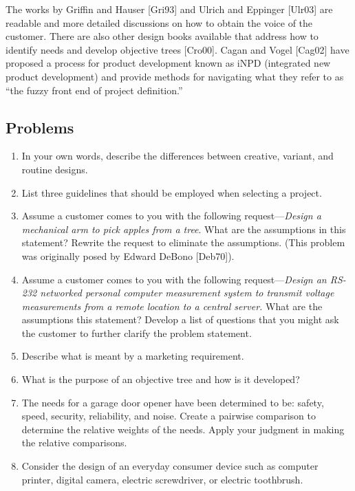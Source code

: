 The works by Griffin and Hauser {[}Gri93{]} and Ulrich and Eppinger
{[}Ulr03{]} are readable and more detailed discussions on how to obtain
the voice of the customer. There are also other design books available
that address how to identify needs and develop objective trees
{[}Cro00{]}. Cagan and Vogel {[}Cag02{]} have proposed a process for
product development known as iNPD (integrated new product development)
and provide methods for navigating what they refer to as ``the fuzzy
front end of project definition.''

\subsection*{Problems}\label{problems}

\begin{enumerate}
\def\labelenumi{\arabic{enumi}.}
\item
  In your own words, describe the differences between creative, variant,
  and routine designs.
\item
  List three guidelines that should be employed when selecting a
  project.
\item
  Assume a customer comes to you with the following
  request---\emph{Design a mechanical arm to pick apples from a tree}.
  What are the assumptions in this statement? Rewrite the request to
  eliminate the assumptions. (This problem was originally posed by
  Edward DeBono {[}Deb70{]}).
\item
  Assume a customer comes to you with the following
  request---\emph{Design an RS-232 networked personal computer
  measurement system to transmit voltage measurements from a remote
  location to a central server.} What are the assumptions this
  statement? Develop a list of questions that you might ask the customer
  to further clarify the problem statement.
\item
  Describe what is meant by a marketing requirement.
\item
  What is the purpose of an objective tree and how is it developed?
\item
  The needs for a garage door opener have been determined to be: safety,
  speed, security, reliability, and noise. Create a pairwise comparison
  to determine the relative weights of the needs. Apply your judgment in
  making the relative comparisons.
\item
  Consider the design of an everyday consumer device such as computer
  printer, digital camera, electric screwdriver, or electric toothbrush.

\end{enumerate}
